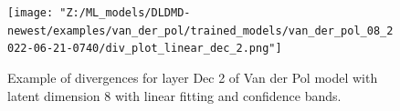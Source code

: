 \begin{figure}[ht]
    \centering
    \begin{minipage}{\textwidth}
        \texttt{[image: "Z:/ML\_models/DLDMD-newest/examples/van\_der\_pol/trained\_models/van\_der\_pol\_08\_2022-06-21-0740/div\_plot\_linear\_dec\_2.png"]}
    \end{minipage}
    \caption{Example of divergences for layer Dec 2 of Van der Pol model with latent dimension 8 
    with linear fitting and confidence bands.}
    \label{fig:divergence of model example}
\end{figure}



  

